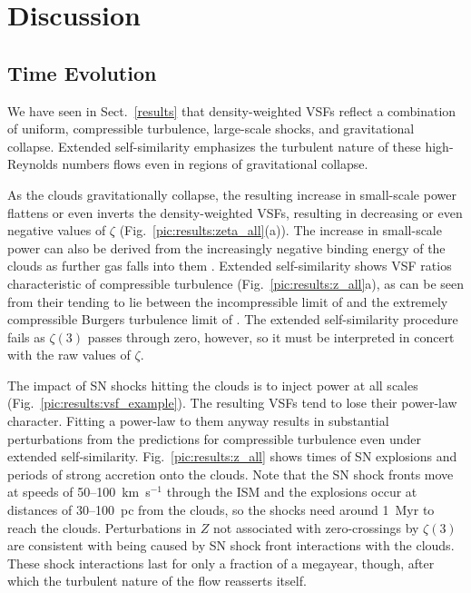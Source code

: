\section{Discussion}\label{discussion}

\subsection{Time Evolution}\label{discussion:normal}


We have seen in Sect.~\ref{results} that density-weighted VSFs reflect a combination of uniform, compressible turbulence, large-scale shocks, and gravitational collapse.  Extended self-similarity emphasizes the turbulent nature of these high-Reynolds numbers flows even in regions of gravitational collapse. 

As the clouds gravitationally collapse, the resulting increase in small-scale power flattens or even inverts the density-weighted VSFs, resulting in decreasing or even negative values of $\zeta$ (Fig.~\ref{pic:results:zeta_all}(a)). The increase in small-scale power can also be derived from the increasingly negative binding energy of the clouds as further gas falls into them .  Extended self-similarity shows VSF ratios characteristic of compressible turbulence (Fig.~\ref{pic:results:z_all}a), as can be seen from their tending to lie between the incompressible limit of \citet{She1994} and the extremely compressible Burgers turbulence limit of \citet{Boldyrev2002}.  The extended self-similarity procedure fails as $\zeta(3)$ passes through zero, however, so it must be interpreted in concert with the raw values of $\zeta$.

The impact of SN shocks hitting the clouds is to inject power at all scales (Fig.~\ref{pic:results:vsf_example}).  The resulting VSFs tend to lose their power-law character. Fitting a power-law to them anyway results in substantial perturbations from the predictions for compressible turbulence even under extended self-similarity.  Fig.~\ref{pic:results:z_all} shows times of SN explosions and periods of strong accretion onto the clouds.  Note that the SN shock fronts move at speeds of 50--100~km~s$^{-1}$ through the ISM and the explosions occur at distances of 30--100~pc from the clouds, so the shocks need around 1~Myr to reach the clouds. Perturbations in $Z$ not associated with zero-crossings by $\zeta(3)$ are consistent with being caused by SN shock front interactions with the clouds.  These shock interactions last for only a fraction of a megayear, though, after which the turbulent nature of the flow reasserts itself.



